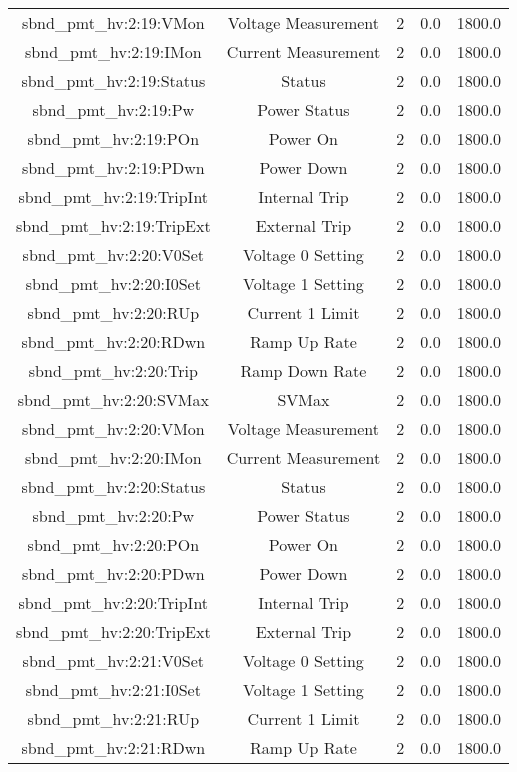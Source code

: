 \begin{center}
\begin{longtable}{c | c c c c }
sbnd\_pmt\_hv:2:19:VMon & Voltage Measurement & 2 & 0.0 & 1800.0\\ 
sbnd\_pmt\_hv:2:19:IMon & Current Measurement & 2 & 0.0 & 1800.0\\ 
sbnd\_pmt\_hv:2:19:Status & Status & 2 & 0.0 & 1800.0\\ 
sbnd\_pmt\_hv:2:19:Pw & Power Status & 2 & 0.0 & 1800.0\\ 
sbnd\_pmt\_hv:2:19:POn & Power On & 2 & 0.0 & 1800.0\\ 
sbnd\_pmt\_hv:2:19:PDwn & Power Down & 2 & 0.0 & 1800.0\\ 
sbnd\_pmt\_hv:2:19:TripInt & Internal Trip & 2 & 0.0 & 1800.0\\ 
sbnd\_pmt\_hv:2:19:TripExt & External Trip & 2 & 0.0 & 1800.0\\ 
sbnd\_pmt\_hv:2:20:V0Set & Voltage 0 Setting & 2 & 0.0 & 1800.0\\ 
sbnd\_pmt\_hv:2:20:I0Set & Voltage 1 Setting & 2 & 0.0 & 1800.0\\ 
sbnd\_pmt\_hv:2:20:RUp & Current 1 Limit & 2 & 0.0 & 1800.0\\ 
sbnd\_pmt\_hv:2:20:RDwn & Ramp Up Rate & 2 & 0.0 & 1800.0\\ 
sbnd\_pmt\_hv:2:20:Trip & Ramp Down Rate & 2 & 0.0 & 1800.0\\ 
sbnd\_pmt\_hv:2:20:SVMax & SVMax & 2 & 0.0 & 1800.0\\ 
sbnd\_pmt\_hv:2:20:VMon & Voltage Measurement & 2 & 0.0 & 1800.0\\ 
sbnd\_pmt\_hv:2:20:IMon & Current Measurement & 2 & 0.0 & 1800.0\\ 
sbnd\_pmt\_hv:2:20:Status & Status & 2 & 0.0 & 1800.0\\ 
sbnd\_pmt\_hv:2:20:Pw & Power Status & 2 & 0.0 & 1800.0\\ 
sbnd\_pmt\_hv:2:20:POn & Power On & 2 & 0.0 & 1800.0\\ 
sbnd\_pmt\_hv:2:20:PDwn & Power Down & 2 & 0.0 & 1800.0\\ 
sbnd\_pmt\_hv:2:20:TripInt & Internal Trip & 2 & 0.0 & 1800.0\\ 
sbnd\_pmt\_hv:2:20:TripExt & External Trip & 2 & 0.0 & 1800.0\\ 
sbnd\_pmt\_hv:2:21:V0Set & Voltage 0 Setting & 2 & 0.0 & 1800.0\\ 
sbnd\_pmt\_hv:2:21:I0Set & Voltage 1 Setting & 2 & 0.0 & 1800.0\\ 
sbnd\_pmt\_hv:2:21:RUp & Current 1 Limit & 2 & 0.0 & 1800.0\\ 
sbnd\_pmt\_hv:2:21:RDwn & Ramp Up Rate & 2 & 0.0 & 1800.0\\ 

\end{longtable}
\end{center}
